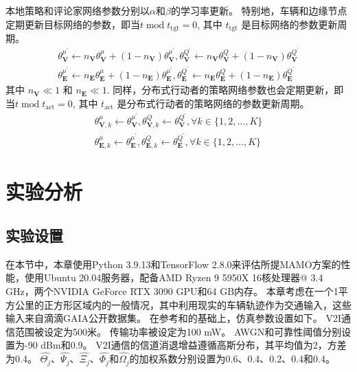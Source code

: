 本地策略和评论家网络参数分别以$\alpha$和$\beta$的学习率更新。
特别地，车辆和边缘节点定期更新目标网络的参数，即当$t \operatorname{mod} t_{\operatorname{tgt}} = 0$, 其中 $t_{\operatorname{tgt}}$ 是目标网络的参数更新周期。
\begin{align}
	\theta_{\mathbf{V}}^{\mu^{\prime}} \leftarrow n_{\mathbf{V}} \theta_{\mathbf{V}}^{\mu}+(1-n_{\mathbf{V}}) \theta_{\mathbf{V}}^{\mu^{\prime}}, \theta_{\mathbf{V}}^{Q^{\prime}} \leftarrow n_{\mathbf{V}} \theta_{\mathbf{V}}^{Q}+(1-n_{\mathbf{V}}) \theta_{\mathbf{V}}^{Q^{\prime}}\\
	\theta_{\mathbf{E}}^{\mu^{\prime}} \leftarrow n_{\mathbf{E}} \theta_{\mathbf{E}}^{\mu}+(1-n_{\mathbf{E}}) \theta_{\mathbf{E}}^{\mu^{\prime}}, \theta_{\mathbf{E}}^{Q^{\prime}} \leftarrow n_{\mathbf{E}} \theta_{\mathbf{E}}^{Q}+(1-n_{\mathbf{E}})  \theta_{\mathbf{E}}^{Q^{\prime}}
\end{align}
\noindent 其中 $n_{\mathbf{V}} \ll 1$ 和 $n_{\mathbf{E}} \ll 1$.
同样，分布式行动者的策略网络参数也会定期更新，即当$t \operatorname{mod} t_{\operatorname{act}} = 0$, 其中 $t_{\operatorname{act}}$ 是分布式行动者的策略网络的参数更新周期。
\begin{align}
	\theta_{\mathbf{V}, k}^{\mu} \leftarrow \theta^{{\mu}^{\prime}}_{\mathbf{V}}, \theta_{\mathbf{V}, k}^{Q} \leftarrow \theta_{\mathbf{V}}^{Q^{\prime}}, \forall k \in \{1, 2, \ldots, K\}\\
	\theta_{\mathbf{E}, k}^{\mu} \leftarrow \theta_{\mathbf{E}}^{\mu^{\prime}}, \theta_{\mathbf{E}, k}^{Q} \leftarrow \theta_{\mathbf{E}}^{Q^{\prime}}, \forall k \in \{1, 2, \ldots, K\}
\end{align}

\section{实验分析}\label{section 5-6}

\subsection{实验设置}

在本节中，本章使用Python 3.9.13和TensorFlow 2.8.0来评估所提MAMO方案的性能，使用Ubuntu 20.04服务器，配备AMD Ryzen 9 5950X 16核处理器@ 3.4 GHz，两个NVIDIA GeForce RTX 3090 GPU和64 GB内存。
本章考虑在一个1平方公里的正方形区域内的一般情况，其中利用现实的车辆轨迹作为交通输入，这些输入来自滴滴GAIA公开数据集\cite{didi}。
在参考\cite{sadek2009distributed}和\cite{wang2019delay}的基础上，仿真参数设置如下。
V2I通信范围被设定为500米。
传输功率被设定为100 mW。
AWGN和可靠性阈值分别设置为-90 dBm和0.9。
V2I通信的信道消退增益遵循高斯分布，其平均值为2，方差为0.4。
$\hat{\Theta_{j}}$、$\hat{\Psi_{j}}$、$\hat{\Xi_{j}}$、$\hat{\Phi_{j}}$和$\hat{\Omega_{j}}$的加权系数分别设置为0.6、0.4、0.2、0.4和0.4。

